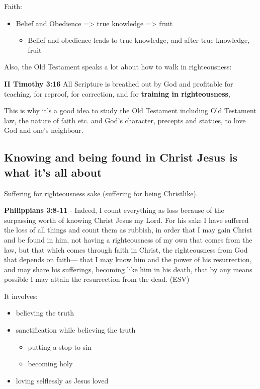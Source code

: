 \documentclass[11pt]{article}
\begin{document}
Faith:
\begin{itemize}
\item Belief and Obedience => true knowledge => fruit
\begin{itemize}
\item Belief and obedience leads to true knowledge, and after true knowledge, fruit
\end{itemize}
\end{itemize}

Also, the Old Testament speaks a lot about how to walk in righteousness:

\textbf{II Timothy 3:16} All Scripture is breathed out by God and profitable for teaching, for reproof, for correction, and for \textbf{training in righteousness},

This is why it's a good idea to study the Old Testament including Old Testament law, the nature of faith etc. and God's character, precepts and statues, to love God and one's neighbour.

\subsection{Knowing and being found in Christ Jesus is what it's all about}
\label{sec:orgf5e118e}
Suffering for righteousness sake (suffering for being Christlike).

\textbf{Philippians 3:8-11} - Indeed, I count everything as loss because of the surpassing worth of knowing Christ Jesus my Lord. For his sake I have suffered the loss of all things and count them as rubbish, in order that I may gain Christ and be found in him, not having a righteousness of my own that comes from the law, but that which comes through faith in Christ, the righteousness from God that depends on faith— that I may know him and the power of his resurrection, and may share his sufferings, becoming like him in his death, that by any means possible I may attain the resurrection from the dead. (ESV)

It involves:
\begin{itemize}
\item believing the truth
\item sanctification while believing the truth
\begin{itemize}
\item putting a stop to sin
\item becoming holy
\end{itemize}
\item loving selflessly as Jesus loved
\end{itemize}
\end{document}

